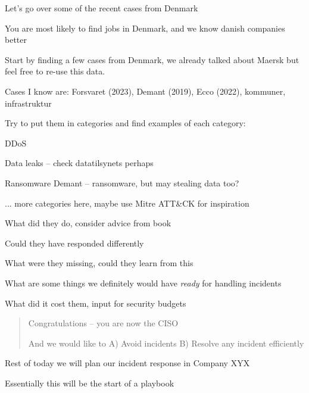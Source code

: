 \documentclass[Screen16to9,17pt]{foils}
\begin{document}


Let's go over some of the recent cases from Denmark

You are most likely to find jobs in Denmark, and we know danish companies better


Start by finding a few cases from Denmark, we already talked about Maersk but feel free to re-use this data.

Cases I know are: Forsvaret (2023), Demant (2019), Ecco (2022), kommuner, infrastruktur

Try to put them in categories and find examples of each category:
\begin{list2}
\item DDoS
\item Data leaks -- check datatilsynets perhaps
\item Ransomware Demant -- ransomware, but may stealing data too?
\item ... more categories here, maybe use Mitre ATT\&CK for inspiration
\end{list2}


\begin{list2}
\item What did they do, consider advice from book
\item Could they have responded differently
\item What were they missing, could they learn from this
\item What are some things we definitely would have \emph{ready} for handling incidents
\item What did it cost them, input for security budgets
\end{list2}




\begin{quote}
Congratulations -- you are now the CISO

And we would like to A) Avoid incidents B) Resolve any incident efficiently
\end{quote}

\begin{list2}
\item Rest of today we will plan our incident response in Company XYX
\item Essentially this will be the start of a playbook
\end{list2}
\end{document}
